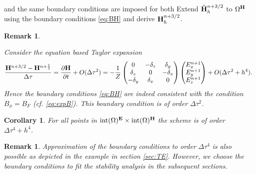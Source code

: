 \documentclass[12pt,reqno]{amsart}
\newcommand{\e}{{\bf E}}
\newcommand{\h}{{\bf H}}
\newtheorem{cor}[theorem]{Corollary}
\newtheorem{rem}[theorem]{Remark}
\theoremstyle{definition}
\numberwithin{equation}{section}
\newcommand{\intr}[1]{\mathrm{int}(#1)}
\def\Gw{\Omega}     \def\Gx{\Xi}         \def\Gy{\Psi}
\begin{document}
	and the same boundary conditions are imposed for both 
		Extend $\tilde{\h}_h^{n+3/2}$
	to $\Gw^\h$ using the boundary conditions \eqref{eq:BH} and derive $\h_h^{n+3/2}$.
\begin{rem}\label{rem:expB}


Consider the equation based  Taylor expansion
	$$
	\frac{\h^{n+3/2}-\h^{n+\frac{1}{2} } }{\Delta \tau}=
	\frac{\partial \h}{\partial t}+O(\Delta \tau ^2)=
	-\frac{1}{Z}	\begin{pmatrix}
		0& -\delta_z & \delta _y\\
		\delta_z&0&-\delta_x\\
		-\delta_y&\delta_x&0\\
	\end{pmatrix}
	\begin{pmatrix}
		E_x^{n+1}\\
		E_y^{n+1}\\
		E_z^{n+1}
	\end{pmatrix}+O(\Delta \tau^2+h^4).
	$$
	Hence the  boundary conditions \eqref{eq:BH} are 
 indeed consistent with the condition 
	$B_\phi=B_F$ (cf. \eqref{eq:expB}).
 This boundary condition is of order $\Delta \tau^2$.
\end{rem}
	\begin{cor}
		For all points in $\intr \Gw^{\e}\times\intr\Gw^\h$ the scheme is of order $\Delta \tau^4+h^4$.
	\end{cor}
   
	\begin{rem}
	Approximation of the boundary conditions to order $\Delta \tau ^4$ is also possible as depicted in the example in section \ref{sec:TE}. However, we choose the boundary conditions to fit the stability analysis in the subsequent sections.
	\end{rem}

	


	
\end{document}
